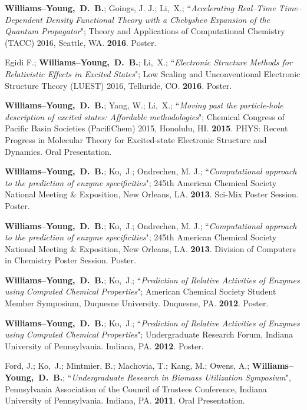 \documentclass[10pt]{res} %
\newcommand*\me[0]{{\bf Williams--Young,~D.~B.}}
\newcommand*\xsli[0]{Li,~X.}
\newcommand*\ko[0]{Ko,~J.}
\begin{document}
\begin{resume}
\vspace{15pt} %
\begin{etaremune}
  \item \me; Goings, J. J.; \xsli;
        ``\emph{Accelerating Real--Time Time--Dependent Density Functional Theory with a Chebyshev 
	  Expansion of the Quantum Propagator}";
	Theory and Applications of Computational Chemistry (TACC) 2016, Seattle, WA.
	\textbf{2016}. Poster.
  \item Egidi F.; \me; \xsli;
        ``\emph{Electronic Structure Methods for Relativistic Effects in Excited States}";
	Low Scaling and Unconventional Electronic Structure Theory (LUEST) 2016, Telluride, CO.
	\textbf{2016}. Poster.
  \item \me; Yang, W.; \xsli;
        ``\emph{Moving past the particle-hole description of excited states: Affordable methodologies}";
	Chemical Congress of Pacific Basin Societies (PacifiChem) 2015, Honolulu, HI.
	\textbf{2015}. 
	PHYS: Recent Progress in Molecular Theory for Excited-state Electronic Structure and
	Dynamics. Oral Presentation.
  \item \me; \ko; Ondrechen, M. J.;
	``\emph{Computational approach to the prediction of enzyme specificities}";
	245th American Chemical Society National Meeting \& Exposition, New Orleans, LA.
	\textbf{2013}. Sci-Mix Poster Session. Poster.
  \item \me; \ko; Ondrechen, M. J.;
	``\emph{Computational approach to the prediction of enzyme specificities}";
	245th American Chemical Society National Meeting \& Exposition, New Orleans, LA.
	\textbf{2013}. Division of Computers in Chemistry Poster Session. Poster.
  \item \me; \ko;
	``\emph{Prediction of Relative Activities of Enzymes using Computed Chemical Properties}";
	American Chemical Society Student Member Symposium, Duquesne University. Duquesne, PA.
	\textbf{2012}. Poster.
  \item \me; \ko;
	``\emph{Prediction of Relative Activities of Enzymes using Computed Chemical Properties}";
	Undergraduate Research Forum, Indiana University of Pennsylvania. Indiana, PA.
	\textbf{2012}. Poster.
  \item Ford, J.; \ko; Mintmier, B.; Machovia, T.; Kang, M.; Owens, A.; \me;
	``\emph{Undergraduate Research in Biomass Utilization Symposium}",
	Pennsylvania Association of the Council of Trustees Conference, Indiana University of Pennsylvania.
	Indiana, PA. \textbf{2011}. Oral Presentation.
\end{etaremune}


\end{resume}
\end{document}
